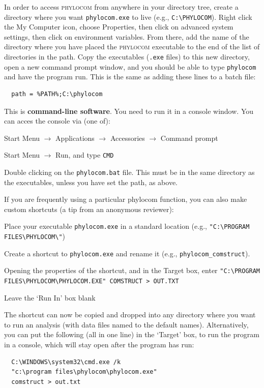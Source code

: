 \documentclass[12pt,letterpaper]{article}
\begin{document}
\label{unixpath}In order to access {\scshape phylocom} from anywhere in your directory
tree, create a directory where you want \verb|phylocom.exe| to live
(e.g., \verb|C:\PHYLOCOM|).  Right click the My Computer icon, choose
Properties, then click on advanced system settings, then click on
environment variables. From there, add the name of the directory where
you have placed the {\scshape phylocom} executable to the end of the
list of directories in the path. Copy the executables (\verb|.exe|
files) to this new directory, open a new command prompt window, and
you should be able to type \verb|phylocom| and have the program run.
This is the same as adding these lines to a batch file:
\begin{verbatim}
  path = %PATH%;C:\phylocom
\end{verbatim}
 
This is {\bf command-line software}. You need to run it in a console
window.  You can acces the console via (one of):
\begin{compactenum}
  \item Start Menu $\to$ Applications $\to$ Accessories $\to$ Command
    prompt
  \item Start Menu $\to$ Run, and type \verb|CMD| 
  \item Double clicking on the \verb|phylocom.bat| file.  This must be
    in the same directory as the executables, unless you have set the
    path, as above.
\end{compactenum}

If you are frequently using a particular {\sc phylocom} function, you
can also make custom shortcuts (a tip from an anonymous reviewer):
\begin{compactenum}
  \item Place your executable \verb|phylocom.exe| in a standard
    location (e.g., \verb|"C:\PROGRAM FILES\PHYLOCOM\"|)
  \item Create a shortcut to \verb|phylocom.exe| and rename it (e.g.,
    \verb|phylocom_comstruct|).
  \item Opening the properties of
    the shortcut, and in the Target box, enter
    \verb|"C:\PROGRAM FILES\PHYLOCOM\PHYLOCOM.EXE" COMSTRUCT > OUT.TXT|
  \item Leave the `Run In' box blank
\end{compactenum}
The shortcut can now be copied and dropped into any directory where
you want to run an analysis (with data files named to the default
names).  Alternatively, you can put the following (all in one line) in
the `Target' box, to run the program in a console, which will stay
open after the program has run:
\begin{verbatim} 
  C:\WINDOWS\system32\cmd.exe /k 
  "c:\program files\phylocom\phylocom.exe" 
  comstruct > out.txt
\end{verbatim}
\end{document}
